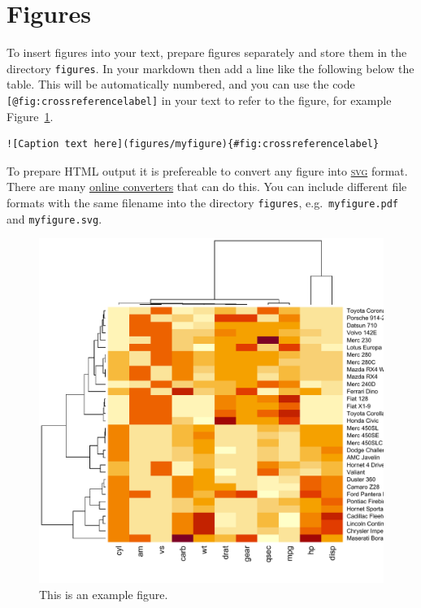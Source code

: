 \hypertarget{figures}{%
\section{Figures}\label{figures}}

To\paragraphnumber{[2.8]} insert figures into your text, prepare figures
separately and store them in the directory \texttt{figures}. In your
markdown then add a line like the following below the table. This will
be automatically numbered, and you can use the code
\texttt{{[}@fig:crossreferencelabel{]}} in your text to refer to the
figure, for example Figure~\ref{fig:crossreferencelabel}.

\begin{verbatim}
![Caption text here](figures/myfigure){#fig:crossreferencelabel}
\end{verbatim}

To\paragraphnumber{[2.9]} prepare HTML output it is prefereable to
convert any figure into
\href{https://en.wikipedia.org/wiki/SVG}{\textsc{svg}} format. There are
many \href{https://convertio.co/pdf-svg/}{online converters} that can do
this. You can include different file formats with the same filename into
the directory \texttt{figures}, e.g.~\texttt{myfigure.pdf} and
\texttt{myfigure.svg}.

\begin{figure}
\hypertarget{fig:crossreferencelabel}{%
\centering
\includegraphics{figures/myfigure.pdf}
\caption{This is an example figure.}\label{fig:crossreferencelabel}
}
\end{figure}

